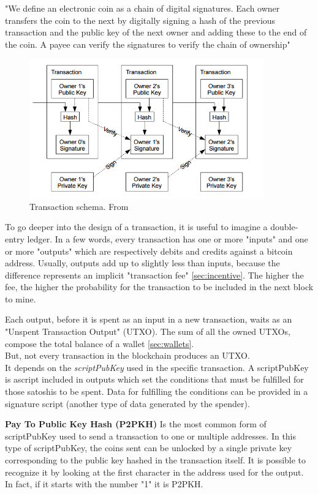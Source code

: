"We define an electronic coin as a chain of digital signatures.  Each owner transfers 
the coin to the next by digitally signing a hash of the previous transaction and the 
public key of the next owner and adding these to the end of the coin.  A payee can 
verify the signatures to verify the chain of ownership"\cite{bitcoin}
\begin{figure}[h]
    \centering
    \includegraphics[height=6cm]{bitcoin-transaction.png}
    \caption{Transaction schema. From \cite{bitcoin}}
    \label{fig:trx}
\end{figure}

To go deeper into the design of a transaction, it is useful to imagine a double-entry
ledger. In a few words, every transaction has one or more "inputs" and one or more "outputs"
which are respectively debits and credits against a bitcoin address. 
Usually, outputs add up to slightly less than inputs, because the difference
represents an implicit "transaction fee" \ref{sec:incentive}. The higher the fee, the higher the 
probability for the transaction to be included in the next block to mine.

Each output, before it is spent as an input in a new transaction, waits as an "Unspent
Transaction Output" (UTXO). The sum of all the owned UTXOs, compose the total balance
of a wallet \ref{sec:wallets}.\\
But, not every transaction in the blockchain produces an UTXO.\\ 
It depends on the \textit{scriptPubKey} used in the specific transaction.
A scriptPubKey is ascript included in outputs which set the conditions that 
must be fulfilled for those satoshis to be spent. Data for fulfilling the conditions 
can be provided in a signature script (another type of data generated by the spender).
\bigskip 

\textbf{Pay To Public Key Hash (P2PKH)} 
Is the most common form of scriptPubKey used to send a transaction to one or multiple 
addresses. In this type of scriptPubKey, the coins sent can be unlocked by a single 
private key corresponding to the public key hashed in the transaction itself. It is 
possible to recognize it by looking at the first character in the address used for the
output. In fact, if it starts with the number "1" it is P2PKH.\cite{bitcoin.org}\pagebreak
\bigskip 

